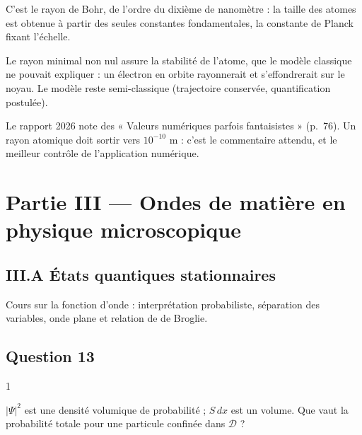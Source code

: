 \documentclass[11pt,a4paper]{article}
\newcommand{\equationajustee}[1]{%
  \sbox{\boiteequation}{$\displaystyle #1$}%
  \ifdim\wd\boiteequation>\linewidth
    \[\resizebox{\linewidth}{!}{\usebox{\boiteequation}}\]%
  \else
    \[#1\]%
  \fi}
\begin{document}
\equationajustee{\boxed{r_{c,\min}\simeq5\times10^{-11}\ \text{m}}}

C'est le rayon de Bohr, de l'ordre du dixième de nanomètre : la taille des atomes est obtenue à partir des seules constantes fondamentales, la constante de Planck fixant l'échelle.

Le rayon minimal non nul assure la stabilité de l'atome, que le modèle classique ne pouvait expliquer : un électron en orbite rayonnerait et s'effondrerait sur le noyau. Le modèle reste semi-classique (trajectoire conservée, quantification postulée).

\begin{jury}

Le rapport 2026 note des « Valeurs numériques parfois fantaisistes » (p.~76). Un rayon atomique doit sortir vers \(10^{-10}\) m : c'est le commentaire attendu, et le meilleur contrôle de l'application numérique.

\end{jury}

\hypertarget{partie-iii-ondes-de-matiuxe8re-en-physique-microscopique}{%
\section{Partie III --- Ondes de matière en physique microscopique}\label{partie-iii-ondes-de-matiuxe8re-en-physique-microscopique}}

\hypertarget{iii.a-uxe9tats-quantiques-stationnaires}{%
\subsection{III.A États quantiques stationnaires}\label{iii.a-uxe9tats-quantiques-stationnaires}}

Cours sur la fonction d'onde : interprétation probabiliste, séparation des variables, onde plane et relation de de Broglie.

\hypertarget{question-13}{%
\subsection{Question 13}\label{question-13}}

\begin{indication}{1}

\(|\Psi|^2\) est une densité volumique de probabilité ; \(S\,dx\) est un volume. Que vaut la probabilité totale pour une particule confinée dans \(\mathscr D\) ?

\end{indication}
\end{document}
